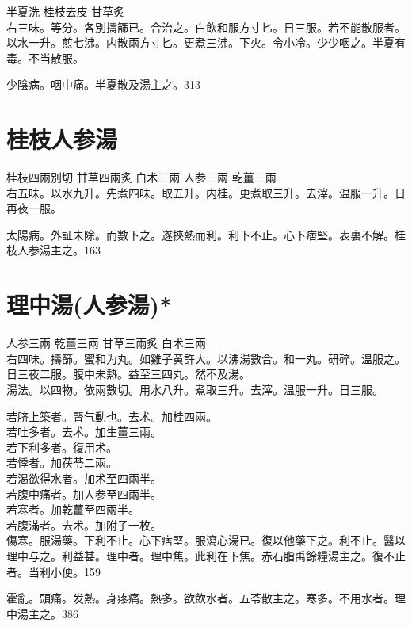 半夏{\scriptsize 洗} 桂枝{\scriptsize 去皮} 甘草{\scriptsize 炙}\\
右三味。等分。各別擣篩已。合治之。白飲和服方寸匕。日三服。若不能散服者。以水一升。煎七沸。内散兩方寸匕。更煮三沸。下火。令小冷。少少咽之。半夏有毒。不当散服。

少陰病。咽中痛。半夏散及湯主之。313

\section{桂枝人参湯}

桂枝{\scriptsize 四兩別切} 甘草{\scriptsize 四兩炙} 白术{\scriptsize 三兩} 人参{\scriptsize 三兩} 乾薑{\scriptsize 三兩}\\
右五味。以水九升。先煮四味。取五升。内桂。更煮取三升。去滓。温服一升。日再夜一服。

太陽病。外証未除。而數下之。遂挾熱而利。利下不止。心下痞堅。表裏不解。桂枝人参湯主之。163

\section{理中湯(人参湯)*}

人参{\scriptsize 三兩} 乾薑{\scriptsize 三兩} 甘草{\scriptsize 三兩炙} 白术{\scriptsize 三兩}\\
右四味。擣篩。蜜和为丸。如雞子黄許大。以沸湯數合。和一丸。研碎。温服之。日三夜二服。腹中未熱。益至三四丸。然不及湯。\\
湯法。以四物。依兩數切。用水八升。煮取三升。去滓。温服一升。日三服。

{\khaaitp 若}脐上築者。腎气動也。去术。加桂四兩。\\
{\khaaitp 若}吐多者。去术。加生薑三兩。\\
{\khaaitp 若}下{\khaaitp 利}多者。復用术。\\
{\khaaitp 若}悸者。加茯苓二兩。\\
{\khaaitp 若}渴{\khaaitp 欲得水}者。加术至四兩半。\\
{\khaaitp 若}腹中痛者。加人参至四兩半。\\
{\khaaitp 若}寒者。加乾薑至四兩半。\\
{\khaaitp 若}腹滿者。去术。加附子一枚。\\

傷寒。服湯藥。下利不止。心下痞堅。服瀉心湯已。復以他藥下之。利不止。醫以理中与之。利益甚。理中者。理中焦。此利在下焦。赤石脂禹餘糧湯主之。復不止者。当利小便。159

霍亂。頭痛。发熱。身疼痛。熱多。欲飲水者。五苓散主之。寒多。不用水者。理中湯主之。386

